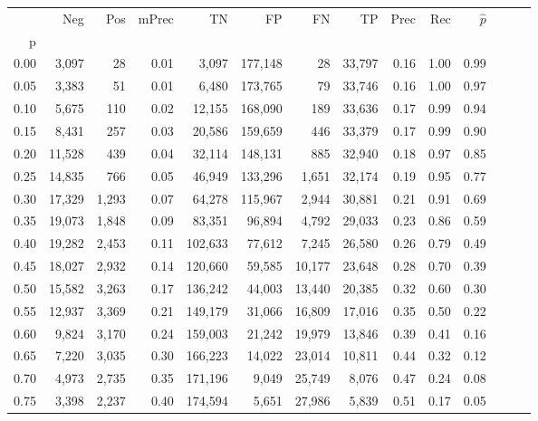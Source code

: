 \begin{tabular}{rrrrrrrrrrrrrr}
\toprule
{} &     Neg &    Pos & mPrec &       TN &       FP &      FN &      TP &  Prec &   Rec & $\hat{p}$ \\
p    &         &        &       &          &          &         &         &       &       &           \\
\midrule
0.00 &   3,097 &     28 &  0.01 &    3,097 &  177,148 &      28 &  33,797 &  0.16 &  1.00 &      0.99 \\
0.05 &   3,383 &     51 &  0.01 &    6,480 &  173,765 &      79 &  33,746 &  0.16 &  1.00 &      0.97 \\
0.10 &   5,675 &    110 &  0.02 &   12,155 &  168,090 &     189 &  33,636 &  0.17 &  0.99 &      0.94 \\
0.15 &   8,431 &    257 &  0.03 &   20,586 &  159,659 &     446 &  33,379 &  0.17 &  0.99 &      0.90 \\
0.20 &  11,528 &    439 &  0.04 &   32,114 &  148,131 &     885 &  32,940 &  0.18 &  0.97 &      0.85 \\
0.25 &  14,835 &    766 &  0.05 &   46,949 &  133,296 &   1,651 &  32,174 &  0.19 &  0.95 &      0.77 \\
0.30 &  17,329 &  1,293 &  0.07 &   64,278 &  115,967 &   2,944 &  30,881 &  0.21 &  0.91 &      0.69 \\
0.35 &  19,073 &  1,848 &  0.09 &   83,351 &   96,894 &   4,792 &  29,033 &  0.23 &  0.86 &      0.59 \\
0.40 &  19,282 &  2,453 &  0.11 &  102,633 &   77,612 &   7,245 &  26,580 &  0.26 &  0.79 &      0.49 \\
0.45 &  18,027 &  2,932 &  0.14 &  120,660 &   59,585 &  10,177 &  23,648 &  0.28 &  0.70 &      0.39 \\
0.50 &  15,582 &  3,263 &  0.17 &  136,242 &   44,003 &  13,440 &  20,385 &  0.32 &  0.60 &      0.30 \\
0.55 &  12,937 &  3,369 &  0.21 &  149,179 &   31,066 &  16,809 &  17,016 &  0.35 &  0.50 &      0.22 \\
0.60 &   9,824 &  3,170 &  0.24 &  159,003 &   21,242 &  19,979 &  13,846 &  0.39 &  0.41 &      0.16 \\
0.65 &   7,220 &  3,035 &  0.30 &  166,223 &   14,022 &  23,014 &  10,811 &  0.44 &  0.32 &      0.12 \\
0.70 &   4,973 &  2,735 &  0.35 &  171,196 &    9,049 &  25,749 &   8,076 &  0.47 &  0.24 &      0.08 \\
0.75 &   3,398 &  2,237 &  0.40 &  174,594 &    5,651 &  27,986 &   5,839 &  0.51 &  0.17 &      0.05 \\

\end{tabular}
